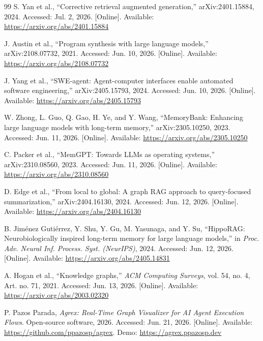 \begin{thebibliography}{99}
S. Yan et al., ``Corrective retrieval augmented generation,'' arXiv:2401.15884,
2024. Accessed: Jul. 2, 2026. [Online]. Available:
\url{https://arxiv.org/abs/2401.15884}

J. Austin et al., ``Program synthesis with large language models,''
arXiv:2108.07732, 2021. Accessed: Jun. 10, 2026. [Online]. Available:
\url{https://arxiv.org/abs/2108.07732}

J. Yang et al., ``SWE-agent: Agent-computer interfaces enable automated
software engineering,'' arXiv:2405.15793, 2024. Accessed: Jun. 10, 2026.
[Online]. Available: \url{https://arxiv.org/abs/2405.15793}

W. Zhong, L. Guo, Q. Gao, H. Ye, and Y. Wang, ``MemoryBank: Enhancing large
language models with long-term memory,'' arXiv:2305.10250, 2023. Accessed:
Jun. 11, 2026. [Online]. Available: \url{https://arxiv.org/abs/2305.10250}

C. Packer et al., ``MemGPT: Towards LLMs as operating systems,''
arXiv:2310.08560, 2023. Accessed: Jun. 11, 2026. [Online]. Available:
\url{https://arxiv.org/abs/2310.08560}

D. Edge et al., ``From local to global: A graph RAG approach to query-focused
summarization,'' arXiv:2404.16130, 2024. Accessed: Jun. 12, 2026.
[Online]. Available: \url{https://arxiv.org/abs/2404.16130}

B. Jiménez Gutiérrez, Y. Shu, Y. Gu, M. Yasunaga, and Y. Su, ``HippoRAG:
Neurobiologically inspired long-term memory for large language models,'' in
\emph{Proc. Adv. Neural Inf. Process. Syst. (NeurIPS)}, 2024. Accessed:
Jun. 12, 2026. [Online]. Available:
\url{https://arxiv.org/abs/2405.14831}

A. Hogan et al., ``Knowledge graphs,'' \emph{ACM Computing Surveys},
vol. 54, no. 4, Art. no. 71, 2021. Accessed: Jun. 13, 2026. [Online].
Available: \url{https://arxiv.org/abs/2003.02320}

P. Pazos Parada, \emph{Agrex: Real-Time Graph Visualizer for AI Agent
Execution Flows}. Open-source software, 2026. Accessed: Jun. 21, 2026.
[Online]. Available: \url{https://github.com/ppazosp/agrex}. Demo:
\url{https://agrex.ppazosp.dev}

\end{thebibliography}
